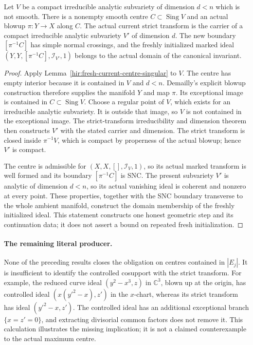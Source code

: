 \begin{theorem}
\label{hir:fresh-current-singular-blowup}
\leanok
Let $V$ be a compact irreducible analytic subvariety of dimension $d<n$ which
is not smooth. There is a nonempty smooth centre $C\subset\operatorname{Sing}V$
and an actual blowup $\pi:Y\to X$ along $C$. The actual current strict
transform is the carrier of a compact irreducible analytic subvariety $V'$ of
dimension $d$. The new boundary $[\pi^{-1}C]$ has simple normal crossings,
and the freshly initialized marked ideal
$(Y,Y,[\pi^{-1}C],\mathcal I_{V'},1)$ belongs to the actual domain of the
canonical invariant.
\end{theorem}
\begin{proof}
Apply Lemma~\ref{hir:fresh-current-centre-singular} to $V$. The centre has
empty interior because it is contained in $V$ and $d<n$. Demailly's explicit
blowup construction therefore supplies the manifold $Y$ and map $\pi$.
Its exceptional image is contained in $C\subset\operatorname{Sing}V$.
Choose a regular point of $V$, which exists for an irreducible analytic
subvariety. It is outside that image, so $V$ is not contained in the
exceptional image. The strict-transform irreducibility and dimension theorem
then constructs $V'$ with the stated carrier and dimension. The strict
transform is closed inside $\pi^{-1}V$, which is compact by properness of
the actual blowup; hence $V'$ is compact.

The centre is admissible for $(X,X,[],\mathcal I_V,1)$, so its actual marked
transform is well formed and its boundary $[\pi^{-1}C]$ is SNC. The present
subvariety $V'$ is analytic of dimension $d<n$, so its actual vanishing ideal
is coherent and nonzero at every point. These properties, together with the
SNC boundary transverse to the whole ambient manifold, construct the domain
membership of the freshly initialized ideal. This statement constructs one
honest geometric step and its continuation data; it does not assert a bound
on repeated fresh initialization.
\end{proof}

\paragraph{The remaining literal producer.}
None of the preceding results closes the obligation on centres contained in
$|E_j|$. It is insufficient to identify the controlled cosupport with the
strict transform. For example, the reduced curve ideal
$(y^2-x^3,z)$ in $\mathbb C^3$, blown up at the origin, has controlled ideal
$(x(y'^2-x),z')$ in the $x$-chart, whereas its strict transform has ideal
$(y'^2-x,z')$. The controlled ideal has an additional exceptional branch
$\{x=z'=0\}$, and extracting divisorial common factors does not remove it.
This calculation illustrates the missing implication; it is not a claimed
counterexample to the actual maximum centre.

